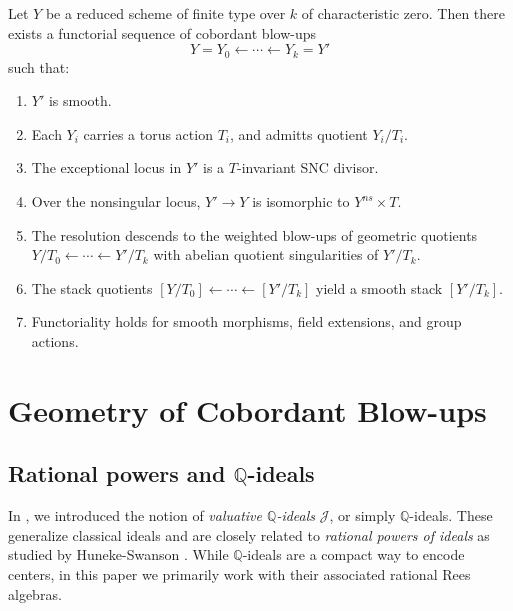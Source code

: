 \documentclass{amsart}
\newcommand{\QQ}{{\mathbb{Q}}}
\newcommand{\cJ}{{\mathcal J}}
\begin{document}
\begin{theorem}\label{nonembedded}
Let \( Y \) be a reduced scheme of finite type over \( k \) of characteristic zero. Then there exists a functorial sequence of cobordant blow-ups
\[
Y = Y_0 \leftarrow \cdots \leftarrow Y_k = Y'
\]
such that:
\begin{enumerate}
    \item \( Y' \) is smooth.
    \item Each \( Y_i \) carries a torus action \( T_i \), and admitts quotient \( Y_i/T_i \).
    \item The exceptional locus in \( Y' \) is a \( T \)-invariant SNC divisor.
    \item Over the nonsingular locus, \( Y' \to Y \) is isomorphic to \( Y^{ns} \times T \).
    \item The resolution descends to the weighted blow-ups of geometric quotients \( Y/T_0 \leftarrow \cdots \leftarrow Y'/T_k \) with abelian quotient singularities of  $ Y'/T_k$.
    \item The stack quotients \( [Y/T_0] \leftarrow \cdots \leftarrow [Y'/T_k] \) yield a smooth stack $ [Y'/T_k].$
    \item Functoriality holds for smooth morphisms, field extensions, and group actions.
\end{enumerate}
\end{theorem}
\section{Geometry of Cobordant Blow-ups}\label{Sec:weighted-blowup}

\subsection{Rational powers and \texorpdfstring{$\QQ$}{Q}-ideals}

In \cite{ATW-weighted}, we introduced the notion of \emph{valuative $\QQ$-ideals} $\cJ$, or simply $\QQ$-ideals. These generalize classical ideals and are closely related to \emph{rational powers of ideals} as studied by Huneke-Swanson \cite[Section 10.5]{HS06}. While $\QQ$-ideals are a compact way to encode centers, in this paper we primarily work with their associated rational Rees algebras.
\end{document}
